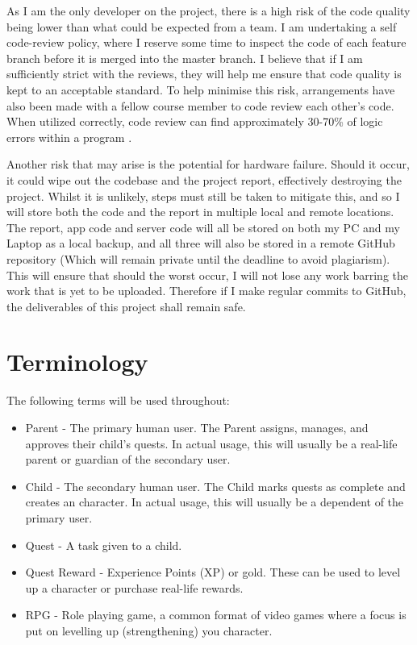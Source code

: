 As I am the only developer on the project, there is a high risk of the code quality being lower than what could be expected from a team.
I am undertaking a self code-review policy, where I reserve some time to inspect the code of each feature branch before it is merged into the master branch.
I believe that if I am sufficiently strict with the reviews, they will help me ensure that code quality is kept to an acceptable standard.
To help minimise this risk, arrangements have also been made with a fellow course member to code review each other's code. 
When utilized correctly, code review can find approximately 30-70\% of logic errors within a program \citep{myers2011art}.

Another risk that may arise is the potential for hardware failure. 
Should it occur, it could wipe out the codebase and the project report, effectively destroying the project. 
Whilst it is unlikely, steps must still be taken to mitigate this, and so I will store both the code and the report in multiple local and remote locations.
The report, app code and server code will all be stored on both my PC and my Laptop as a local backup, and all three will also be stored in a remote GitHub repository (Which will remain private until the deadline to avoid plagiarism).
This will ensure that should the worst occur, I will not lose any work barring the work that is yet to be uploaded.
Therefore if I make regular commits to GitHub, the deliverables of this project shall remain safe. 

\section{Terminology}

The following terms will be used throughout:

\begin{itemize}
	\item Parent - The primary human user. The Parent assigns, manages, and approves their child's quests. In actual usage, this will usually be a real-life parent or guardian of the secondary user. 
	\item Child - The secondary human user. The Child marks quests as complete and creates an character. In actual usage, this will usually be a dependent of the primary user. 
	\item Quest - A task given to a child.
	\item Quest Reward - Experience Points (XP) or gold. These can be used to level up a character or purchase real-life rewards.
	\item RPG - Role playing game, a common format of video games where a focus is put on levelling up (strengthening) you character.
\end{itemize}